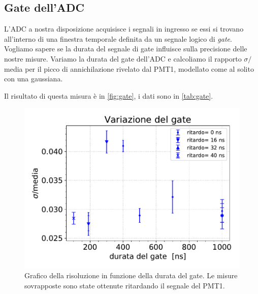 \subsection{Gate dell'ADC}

L'ADC a nostra disposizione acquisisce i segnali in ingresso se essi si trovano all'interno di una finestra temporale definita da un segnale logico di \emph{gate}.
Vogliamo sapere se la durata del segnale di gate influisce sulla precisione delle nostre misure.
Variamo la durata del gate dell'ADC e calcoliamo il rapporto $\sigma\!/$\!media per il picco di annichilazione rivelato dal PMT1, modellato come al solito con una gaussiana.

Il risultato di questa misura è in \autoref{fig:gate}, i dati sono in \autoref{tab:gate}.


\begin{figure}[h]
\centering
\includegraphics[width=20 em]{immagini/gate}
\caption{Grafico della risoluzione in funzione della durata del gate. Le misure sovrapposte sono state ottenute ritardando il segnale del PMT1.}
\label{fig:gate}
\end{figure}

